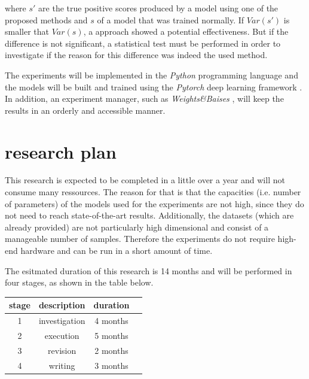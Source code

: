 \documentclass[journal]{IEEEtran}
\begin{document}
where $s'$ are the true positive scores produced by a model using one of the proposed methods and $s$ of a model that was trained normally. 
If $Var(s')$ is smaller that $Var(s)$, a approach showed a potential effectiveness.
But if the difference is not significant, a statistical test must be performed in order to investigate if the reason for this difference was indeed the used method.

The experiments will be implemented in the \emph{Python} programming language and the models will be built and trained using the \emph{Pytorch} deep learning framework \cite{paszke2019pytorch}.
In addition, an experiment manager, such as \emph{Weights\&Baises} \cite{WandB}, will keep the results in an orderly and accessible manner.

\section{research plan}
This research is expected to be completed in a little over a year and will not consume many ressources.
The reason for that is that the capacities (i.e. number of parameters) of the models used for the experiments are not high, since they do not need to reach state-of-the-art results.
Additionally, the datasets (which are already provided) are not particularly high dimensional and consist of a manageable number of samples.
Therefore the experiments do not require high-end hardware and can be run in a short amount of time.

The esitmated duration of this research is 14 months and will be performed in four stages, as shown in the table below.

\begin{center}

        \begin{tabular}{ |c|c|c|c| } 
                \hline
                stage & description & duration \\
                \hline
                1 & investigation & 4 months \\ 
                2 & execution & 5 months \\ 
                3 & revision & 2 months \\ 
                4 & writing & 3 months \\
                \hline

        \end{tabular}
\end{center}
        
\end{document}
